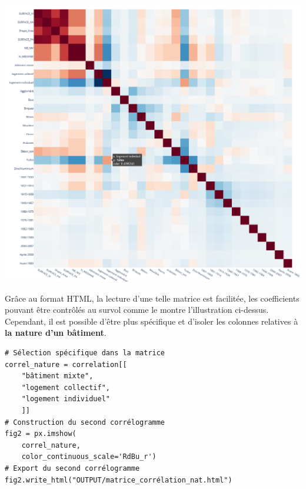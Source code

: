 \documentclass[
  11pt,
  french,
]{article}
\newcounter{customfigs}[section]
\newenvironment{customfigs}[1][] {
    \stepcounter{customfigs}
    Fig \arabic{section}. \arabic{customfigs} : }
\newcommand{\masked}{\vspace*{-\baselineskip}}
\begin{document}
\begin{tcolorbox}[title=\begin{customfigs} Matrice de corrélation du jeu de données agrégé \end{customfigs}]

\begin{center}\includegraphics[width=1\linewidth]{__imgs/matrice_corr_c} \end{center}

\end{tcolorbox}

Grâce au format HTML, la lecture d'une telle matrice est facilitée, les
coefficients pouvant être contrôlés au survol comme le montre
l'illustration ci-dessus. Cependant, il est possible d'être plus
spécifique et d'isoler les colonnes relatives à \textbf{la nature d'un
bâtiment}.

\begin{tcolorbox}[title= Spécification du corrélogramme ,colback=boitecode]
\begin{lstlisting}[style=code]
# Sélection spécifique dans la matrice
correl_nature = correlation[[
    "bâtiment mixte",
    "logement collectif",
    "logement individuel"
    ]]
# Construction du second corrélogramme
fig2 = px.imshow(
    correl_nature,
    color_continuous_scale='RdBu_r')
# Export du second corrélogramme
fig2.write_html("OUTPUT/matrice_corrélation_nat.html")\end{lstlisting}
\end{tcolorbox}
\end{document}
